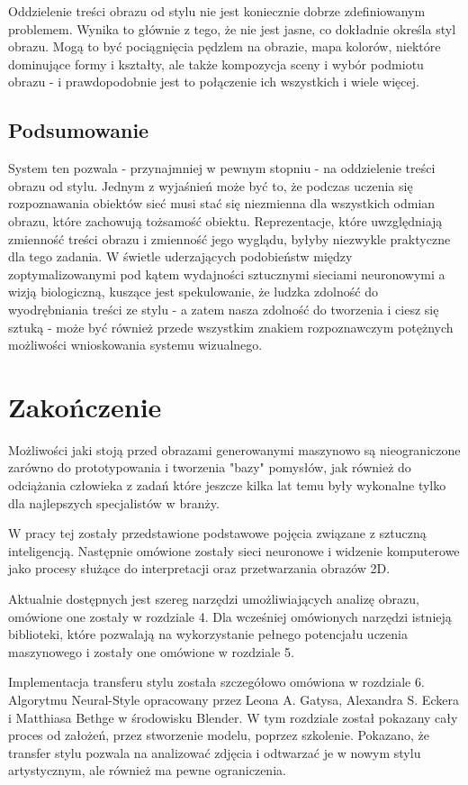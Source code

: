 \documentclass[brudnopis]{xmgr}
\begin{document}
Oddzielenie treści obrazu od stylu nie jest koniecznie dobrze zdefiniowanym problemem. Wynika to głównie z tego, że nie jest jasne, co dokładnie określa styl obrazu. Mogą to być pociągnięcia pędzlem na obrazie, mapa kolorów, niektóre dominujące formy i kształty, ale także kompozycja sceny i wybór podmiotu obrazu - i prawdopodobnie jest to połączenie ich wszystkich i wiele więcej. 

\section{Podsumowanie\label{s:dsssl}}

System ten pozwala - przynajmniej w pewnym stopniu - na oddzielenie treści obrazu od stylu. Jednym z wyjaśnień może być to, że podczas uczenia się rozpoznawania obiektów sieć musi stać się niezmienna dla wszystkich odmian obrazu, które zachowują tożsamość obiektu. Reprezentacje, które uwzględniają zmienność treści obrazu i zmienność jego wyglądu, byłyby niezwykle praktyczne dla tego zadania. W świetle uderzających podobieństw między zoptymalizowanymi pod kątem wydajności sztucznymi sieciami neuronowymi a wizją biologiczną, kuszące jest spekulowanie, że ludzka zdolność do wyodrębniania treści ze stylu - a zatem nasza zdolność do tworzenia i ciesz się sztuką - może być również przede wszystkim znakiem rozpoznawczym potężnych możliwości wnioskowania systemu wizualnego.


\chapter{Zakończenie}
Możliwości jaki stoją przed obrazami generowanymi maszynowo są nieograniczone zarówno do prototypowania i tworzenia "bazy" pomysłów, jak również do odciążania człowieka z zadań które jeszcze kilka lat temu były wykonalne tylko dla najlepszych specjalistów w branży.

W pracy tej zostały przedstawione podstawowe pojęcia związane z sztuczną inteligencją. Następnie omówione zostały sieci neuronowe i widzenie komputerowe jako procesy służące do interpretacji oraz przetwarzania obrazów 2D. 

Aktualnie dostępnych jest szereg narzędzi umożliwiających analizę obrazu, omówione one zostały w rozdziale 4. Dla wcześniej omówionych narzędzi istnieją biblioteki, które pozwalają na wykorzystanie pełnego potencjału uczenia maszynowego i zostały one omówione w rozdziale 5.

Implementacja transferu stylu została szczegółowo omówiona w rozdziale 6. Algorytmu Neural-Style opracowany przez Leona A. Gatysa, Alexandra S. Eckera i Matthiasa Bethge w środowisku Blender. W tym rozdziale został pokazany cały proces od założeń, przez stworzenie modelu, poprzez szkolenie. Pokazano, że transfer stylu pozwala na analizować zdjęcia i odtwarzać je w nowym stylu artystycznym, ale również ma pewne ograniczenia. 
\end{document}
